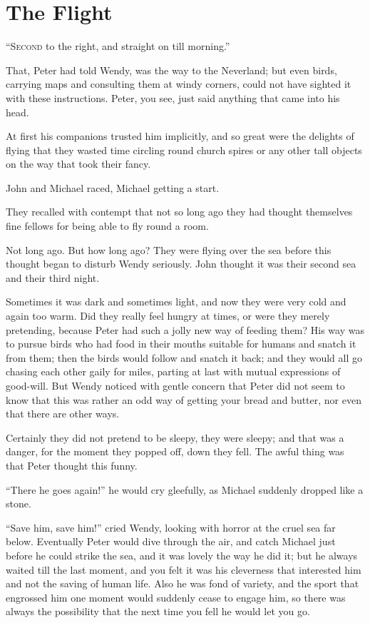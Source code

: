 \chapter{The Flight}

\lettrine{``S}{econd} to the right, and straight on till morning.''

\hspace{\parindent}That, Peter had told Wendy, was the way to the Neverland; but even birds,
carrying maps and consulting them at windy corners, could not have sighted it
with these instructions. Peter, you see, just said anything that came into his
head.

At first his companions trusted him implicitly, and so great were the delights
of flying that they wasted time circling round church spires or any other tall
objects on the way that took their fancy.

John and Michael raced, Michael getting a start.

They recalled with contempt that not so long ago they had thought themselves
fine fellows for being able to fly round a room.

Not long ago. But how long ago? They were flying over the sea before this
thought began to disturb Wendy seriously. John thought it was their second sea
and their third night.

Sometimes it was dark and sometimes light, and now they were very cold and again
too warm. Did they really feel hungry at times, or were they merely pretending,
because Peter had such a jolly new way of feeding them? His way was to pursue
birds who had food in their mouths suitable for humans and snatch it from them;
then the birds would follow and snatch it back; and they would all go chasing
each other gaily for miles, parting at last with mutual expressions of
good-will. But Wendy noticed with gentle concern that Peter did not seem to know
that this was rather an odd way of getting your bread and butter, nor even that
there are other ways.

Certainly they did not pretend to be sleepy, they were sleepy; and that was a
danger, for the moment they popped off, down they fell. The awful thing was that
Peter thought this funny.

``There he goes again!'' he would cry gleefully, as Michael suddenly dropped
like a stone.

``Save him, save him!'' cried Wendy, looking with horror at the cruel sea far
below. Eventually Peter would dive through the air, and catch Michael just
before he could strike the sea, and it was lovely the way he did it; but he
always waited till the last moment, and you felt it was his cleverness that
interested him and not the saving of human life. Also he was fond of variety,
and the sport that engrossed him one moment would suddenly cease to engage him,
so there was always the possibility that the next time you fell he would let you
go.

